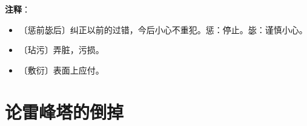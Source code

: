 \documentclass[12pt,UTF-8,openany]{ctexbook}
\begin{document}
\newpage

\textbf{注释}：

\vspace{-1em}

\begin{itemize}
    \setlength\itemsep{-0.2em}
    \item 〔惩前毖后〕纠正以前的过错，今后小心不重犯。惩：停止。毖：谨慎小心。
    \item 〔玷污〕弄脏，污损。
    \item 〔敷衍〕表面上应付。
\end{itemize}

\chapter{论雷峰塔的倒掉}
\end{document}
